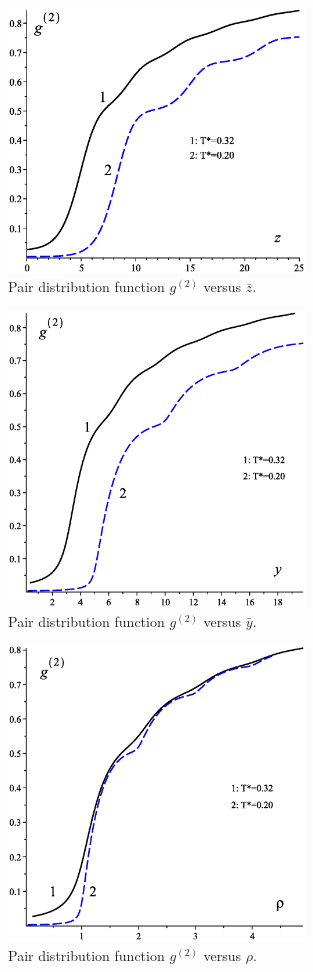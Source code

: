 \begin{figure}[htbp]
	\includegraphics[width=0.7\textwidth,angle=0]{g2_vs_z}
	\caption{Pair distribution function $g^{(2)}$ versus $\bar{z}$.}
	\label{fig:g2_z}
\end{figure}
\begin{figure}[htbp]
	\includegraphics[width=0.7\textwidth,angle=0]{g2_vs_y}
	\caption{Pair distribution function $g^{(2)}$ versus $\bar{y}$.}
	\label{fig:g2_y}
\end{figure}

\begin{figure}[htbp]
	\includegraphics[width=0.7\textwidth,angle=0]{g2_vs_rho}
	\caption{Pair distribution function $g^{(2)}$ versus $\rho$.}
	\label{fig:g2_rho}
\end{figure}

